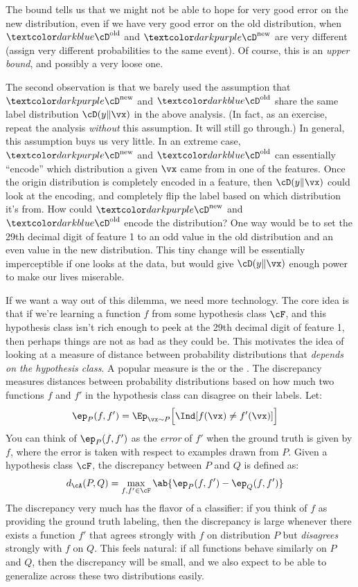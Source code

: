 The bound tells us that we might not be able to hope for very good error on the new distribution, even if we have very good error on the old distribution, when $\Dold$ and $\Dnew$ are very different (assign very different probabilities to the same event).
Of course, this is an \emph{upper bound}, and possibly a very loose one.

The second observation is that we barely used the assumption that $\Dnew$ and $\Dold$ share the same label distribution $\cD(y \| \vx)$ in the above analysis. (In fact, as an exercise, repeat the analysis \emph{without} this assumption. It will still go through.)
In general, this assumption buys us very little.
In an extreme case, $\Dnew$ and $\Dold$ can essentially ``encode'' which distribution a given $\vx$ came from in one of the features.
Once the origin distribution is completely encoded in a feature, then $\cD(y \| \vx)$ could look at the encoding, and completely flip the label based on which distribution it's from.
How could $\Dnew$ and $\Dold$ encode the distribution?
One way would be to set the 29th decimal digit of feature 1 to an odd value in the old distribution and an even value in the new distribution.
This tiny change will be essentially imperceptible if one looks at the data, but would give $\cD(y \| \vx)$ enough power to make our lives miserable.

If we want a way out of this dilemma, we need more technology.
The core idea is that if we're learning a function $f$ from some hypothesis class $\cF$, and this hypothesis class isn't rich enough to peek at the 29th decimal digit of feature 1, then perhaps things are not as bad as they could be.
This motivates the idea of looking at a measure of distance between probability distributions that \emph{depends on the hypothesis class}.
A popular measure is the  or the .
The discrepancy measures distances between probability distributions based on how much two functions $f$ and $f'$ in the hypothesis class can disagree on their labels.
Let:
%
\begin{align}
  \ep_P(f,f')
  &= \Ep_{\vx \sim P} \Big[ \Ind[ f(\vx) \neq f'(\vx) ] \Big]
\end{align}
%
You can think of $\ep_P(f,f')$ as the \emph{error} of $f'$ when the ground truth is given by $f$, where the error is taken with respect to examples drawn from $P$.
Given a hypothesis class $\cF$, the discrepancy between $P$ and $Q$ is defined as:
%
\begin{align}
  d_\cA(P,Q)
  &= \max_{f,f' \in \cF} \ab{ \ep_P(f,f') - \ep_Q(f,f') }
\end{align}
%
The discrepancy very much has the flavor of a classifier: if you think of $f$ as providing the ground truth labeling, then the discrepancy is large whenever there exists a function $f'$ that agrees strongly with $f$ on distribution $P$ but \emph{disagrees} strongly with $f$ on $Q$.
This feels natural: if all functions behave similarly on $P$ and $Q$, then the discrepancy will be small, and we also expect to be able to generalize across these two distributions easily.

